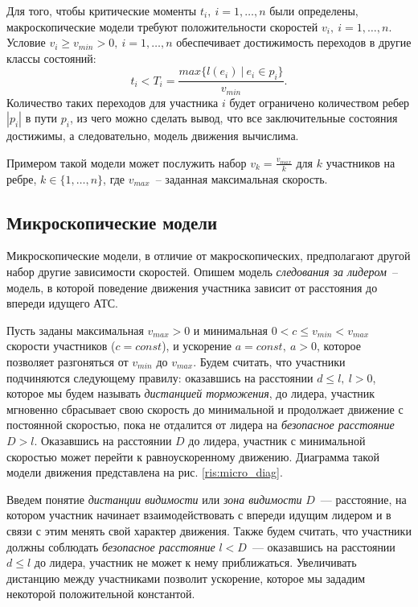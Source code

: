 \documentclass[12pt, a4paper]{article}
\begin{document}
	Для того, чтобы критические моменты $t_i, \: i = 1, \dots, n$ были определены, макроскопические модели требуют положительности скоростей $v_i, \: i = 1, \dots, n$. Условие $v_i \ge v_{min} > 0, \: i = 1, \dots, n$ обеспечивает достижимость переходов в другие классы состояний:
	$$t_i < T_i = \frac{max\{l(e_i) \: | \: e_i \in p_i\}}{v_{min}}.$$
	Количество таких переходов для участника $i$ будет ограничено количеством ребер $|p_i|$ в пути $p_i$, из чего можно сделать вывод, что все заключительные состояния достижимы, а следовательно, модель движения вычислима.
	
	Примером такой модели может послужить набор $v_k = \frac{v_{max}}{k}$ для $k$ участников на ребре, $k \in \{1, \dots, n\}$, где $v_{max}$~-- заданная максимальная скорость. 
	
	\subsection{Микроскопические модели}
	
	Микроскопические модели, в отличие от макроскопических, предполагают другой набор другие зависимости скоростей.
	Опишем модель \textit{следования за лидером}~-- модель, в которой поведение движения участника зависит от расстояния до впереди идущего АТС. 
	
	Пусть заданы максимальная $v_{max} > 0$ и минимальная $0 < c \le v_{min} < v_{max}$ скорости участников ($c = const$), и ускорение $a = const, \: a > 0$, которое позволяет разгоняться от $v_{min}$ до $v_{max}$. Будем считать, что участники подчиняются следующему правилу:
	оказавшись на расстоянии $d \leq l, \: l > 0$, которое мы будем называть \textit{дистанцией торможения}, до лидера, участник
	мгновенно сбрасывает свою скорость до минимальной и продолжает движение с постоянной скоростью, пока не отдалится от лидера на \textit{безопасное расстояние} $D > l$. Оказавшись на расстоянии $D$ до лидера, участник с минимальной скоростью может перейти к равноускоренному движению. Диаграмма такой модели движения представлена на рис. \ref{ris:micro_diag}.
	
	Введем понятие \textit{дистанции видимости} или \textit{зона видимости} $D$~--- расстояние, на котором участник начинает взаимодействовать с впереди идущим лидером и в связи с этим менять свой характер движения. Также будем считать, что участники должны соблюдать \textit{безопасное расстояние} $l < D$~--- оказавшись на расстоянии $d \leq l$ до лидера, участник не может к нему приближаться. Увеличивать дистанцию между участниками позволит ускорение, которое мы зададим некоторой положительной константой.
	
\end{document}
